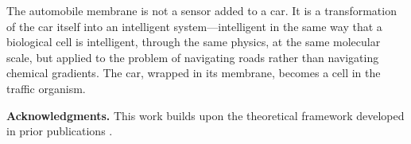 \documentclass[twocolumn,10pt]{article}
\theoremstyle{definition}
\theoremstyle{remark}
\begin{document}
The automobile membrane is not a sensor added to a car. It is a transformation of the car itself into an intelligent system---intelligent in the same way that a biological cell is intelligent, through the same physics, at the same molecular scale, but applied to the problem of navigating roads rather than navigating chemical gradients. The car, wrapped in its membrane, becomes a cell in the traffic organism.

\bigskip

\noindent\textbf{Acknowledgments.} This work builds upon the theoretical framework developed in prior publications \cite{sachikonye2026partition, sachikonye2026single, sachikonye2026trajectory, sachikonye2026backward, sachikonye2026poincare, sachikonye2026atmospheric, sachikonye2026gas, sachikonye2025membrane, sachikonye2025cpu, sachikonye2025circuits, sachikonye2025quantum, sachikonye2025memory, sachikonye2026converter, sachikonye2026lipid, sachikonye2026transplanckian, sachikonye2026buhera, sachikonye2026cynegeticus, sachikonye2026emission, sachikonye2026instrument, sachikonye2026current, sachikonye2026equations, sachikonye2026counting, sachikonye2026architecture, sachikonye2026depth}.



\end{document}
